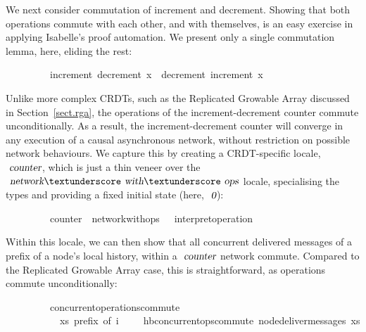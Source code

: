 We next consider commutation of increment and decrement.
Showing that both operations commute with each other, and with themselves, is an easy exercise in applying Isabelle's proof automation.
We present only a single commutation lemma, here, eliding the rest:
\vspace{0.35em}
\begin{isabellebody}
\ \ \ \ \ \ \ \ \ {\isachardoublequoteopen}increment\ {\isacharparenleft}decrement\ x{\isacharparenright}\ {\isacharequal}\ decrement\ {\isacharparenleft}increment\ x{\isacharparenright}{\isachardoublequoteclose}
\end{isabellebody}
\vspace{0.35em}
Unlike more complex CRDTs, such as the Replicated Growable Array discussed in Section~\ref{sect.rga}, the operations of the increment-decrement counter commute unconditionally.
As a result, the increment-decrement counter will converge in any execution of a causal asynchronous network, without restriction on possible network behaviours.
We capture this by creating a CRDT-specific locale, $\isa{counter}$, which is just a thin veneer over the $\isa{network}{\isacharunderscore}\isa{with}{\isacharunderscore}\isa{ops}$ locale, specialising the types and providing a fixed initial state (here, $\isa{0}$):
\vspace{0.35em}
\begin{isabellebody}
\ \ \ \ \ \ \ \ \ counter\ {\isacharequal}\ network{\isacharunderscore}with{\isacharunderscore}ops\ {\isacharunderscore}\ {\isacharunderscore}\ interpret{\isacharunderscore}operation\ {}
\end{isabellebody}
\vspace{0.35em}
Within this locale, we can then show that all concurrent delivered messages of a prefix of a node's local history, within a $\isa{counter}$ network commute.
Compared to the Replicated Growable Array case, this is straightforward, as operations commute unconditionally:
\vspace{0.35em}
\begin{isabellebody}
\ \ \ \ \ \ \ \ \ concurrent{\isacharunderscore}operations{\isacharunderscore}commute{\isacharcolon}\isanewline
\ \ \ \ \ \ \ \ \ \ \ {\isachardoublequoteopen}xs\ prefix\ of\ i{\isachardoublequoteclose}\ \ \ \ \ {\isachardoublequoteopen}hb{\isachardot}concurrent{\isacharunderscore}ops{\isacharunderscore}commute\ {\isacharparenleft}node{\isacharunderscore}deliver{\isacharunderscore}messages\ xs{\isacharparenright}{\isachardoublequoteclose}
\end{isabellebody}
